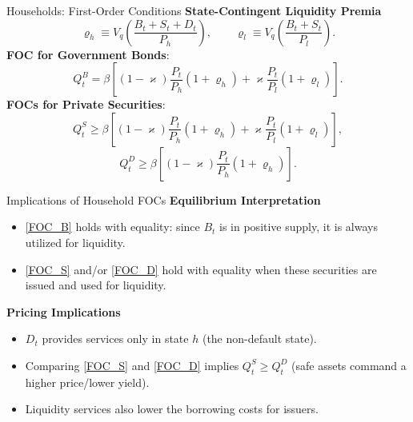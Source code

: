 \documentclass[11pt,aspectratio=169]{beamer}
\begin{document}
\begin{frame}{Households: First-Order Conditions}
\small
\textbf{State-Contingent Liquidity Premia}
\[
\varrho_h
\equiv V_{q}\!\left( \frac{B_{t}+S_{t}+D_{t}}{P_{h}}\right),
\qquad
\varrho_l
 \equiv  V_{q}\!\left( \frac{B_{t}+S_{t}}{P_{l}}\right).
\]
\textbf{FOC for Government Bonds}:
\begin{equation}
Q_{t}^{B}=\beta \left[ (1-\varkappa )\frac{P_{t}}{P_{h}}(1+\varrho
_{h})+\varkappa \frac{P_{t}}{P_{l}}(1+\varrho _{l})\right].
\label{FOC_B}
\end{equation}
\textbf{FOCs for Private Securities}:
\begin{equation}
Q_{t}^{S}\geq \beta \left[ (1-\varkappa )\frac{P_{t}}{P_{h}}(1+\varrho
_{h})+\varkappa \frac{P_{t}}{P_{l}}(1+\varrho _{l})\right] ,
\label{FOC_S}
\end{equation}
\begin{equation}
Q_{t}^{D}\geq \beta \left[ (1-\varkappa ) \frac{P_{t}}{P_{h}}(1+\varrho _{h})%
\right] . \label{FOC_D}
\end{equation}
\end{frame}

\begin{frame}{Implications of Household FOCs}
\small
\textbf{Equilibrium Interpretation}
\begin{itemize}
    \item \eqref{FOC_B} holds with equality: since $B_t$ is in positive supply, it is always utilized for liquidity.
    \item \eqref{FOC_S} and/or \eqref{FOC_D} hold with equality when these securities are issued and used for liquidity.
\end{itemize}

\vspace{0.4em}
\textbf{Pricing Implications}
\begin{itemize}
    \item $D_t$ provides services only in state $h$ (the non-default state).
    \item Comparing \eqref{FOC_S} and \eqref{FOC_D} implies $Q_{t}^{S} \geq Q_{t}^{D}$ (safe assets command a higher price/lower yield).
    \item Liquidity services also lower the borrowing costs for issuers.
\end{itemize}
\end{frame}
\end{document}
